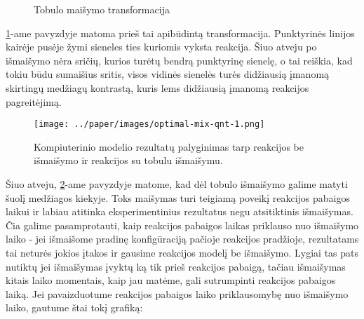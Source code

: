 \begin{figure}[!h]
\centering
{}
\caption{Tobulo maišymo transformacija}
\label{perfect-2x2-mix}
\end{figure}
\ref{perfect-2x2-mix}-ame pavyzdyje matoma prieš tai apibūdintą transformacija. Punktyrinės linijos kairėje pusėje žymi sieneles ties kuriomis vyksta reakcija. Šiuo atveju po išmaišymo nėra sričių, kurios turėtų bendrą punktyrinę sienelę, o tai reiškia, kad tokiu būdu sumaišius sritis, visos vidinės sienelės turės didžiausią įmanomą skirtingų medžiagų kontrastą, kuris lems didžiausią įmanomą reakcijos pagreitėjimą.

\begin{figure}[h!]
    \centering
    \texttt{[image: ../paper/images/optimal-mix-qnt-1.png]}

    \caption{Kompiuterinio modelio rezultatų palyginimas tarp reakcijos be išmaišymo ir reakcijos su tobulu išmaišymu.  }

    \label{optimal-mix-qnt}
\end{figure}

Šiuo atveju, \ref{optimal-mix-qnt}-ame pavyzdyje matome, kad dėl tobulo išmaišymo galime matyti šuolį medžiagos kiekyje. Toks maišymas turi teigiamą poveikį reakcijos pabaigos laikui ir labiau atitinka eksperimentinius rezultatus negu atsitiktinis išmaišymas.
Čia galime pasamprotauti, kaip reakcijos pabaigos laikas priklauso nuo išmaišymo laiko - jei išmaišome pradinę konfigūraciją pačioje reakcijos pradžioje, rezultatams tai neturės jokios įtakos ir gausime reakcijos modelį be išmaišymo. Lygiai tas pats nutiktų jei išmaišymas įvyktų ką tik prieš reakcijos pabaigą, tačiau išmaišymas kitais laiko momentais, kaip jau matėme, gali sutrumpinti reakcijos pabaigos laiką. Jei pavaizduotume reakcijos pabaigos laiko priklausomybę nuo išmaišymo laiko, gautume štai tokį grafiką:

